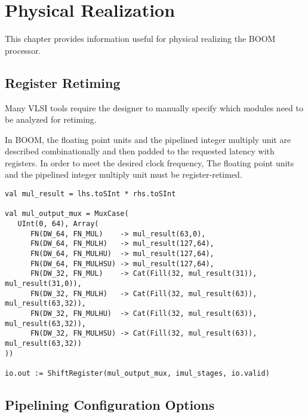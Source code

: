 \chapter{Physical Realization}\label{chapter:physical}

This chapter provides information useful for physical realizing the BOOM processor.

\section{Register Retiming}
 
Many VLSI tools require the designer to manually specify which modules need to
be analyzed for retiming. 
                 
In BOOM, the floating point units and the pipelined integer multiply unit are
described combinationally and then padded to the requested latency with
registers.
In order to meet the desired clock frequency, The floating point units and the
pipelined integer multiply unit must be register-retimed. 
 
\begin{center}
\begin{minipage}{0.90\textwidth}
\begin{lstlisting}[caption=Pipelined integer multiply unit required register retiming to be realized properly.]
val mul_result = lhs.toSInt * rhs.toSInt
                                                                               
val mul_output_mux = MuxCase(                                                  
   UInt(0, 64), Array(                                                         
      FN(DW_64, FN_MUL)    -> mul_result(63,0),                                
      FN(DW_64, FN_MULH)   -> mul_result(127,64),                              
      FN(DW_64, FN_MULHU)  -> mul_result(127,64),                              
      FN(DW_64, FN_MULHSU) -> mul_result(127,64),                              
      FN(DW_32, FN_MUL)    -> Cat(Fill(32, mul_result(31)), mul_result(31,0)), 
      FN(DW_32, FN_MULH)   -> Cat(Fill(32, mul_result(63)), mul_result(63,32)),
      FN(DW_32, FN_MULHU)  -> Cat(Fill(32, mul_result(63)), mul_result(63,32)),
      FN(DW_32, FN_MULHSU) -> Cat(Fill(32, mul_result(63)), mul_result(63,32)) 
))                                                                             
                                                                               
io.out := ShiftRegister(mul_output_mux, imul_stages, io.valid)                 
\end{lstlisting}\label{code:pipeview}
\end{minipage}
\end{center}

\section{Pipelining Configuration Options}


 
